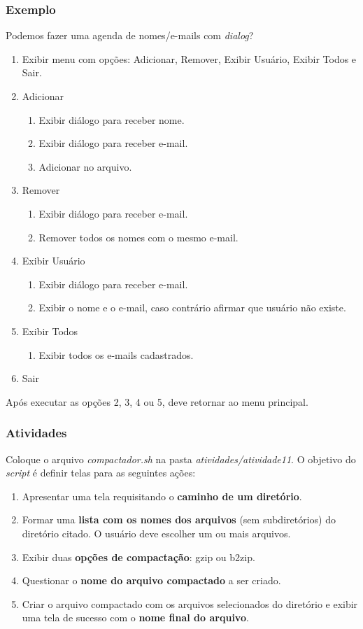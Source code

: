 \documentclass{beamer}
\begin{document}
   \begin{frame}
      \frametitle{Exemplo}
      Podemos fazer uma agenda de nomes/e-mails com \textit{dialog}?
      \scriptsize
      \begin{enumerate}
         \item Exibir menu com opções: Adicionar, Remover, Exibir Usuário, Exibir Todos e Sair.
	 \item Adicionar
	 \begin{enumerate}
            \scriptsize
	    \item Exibir diálogo para receber nome.
	    \item Exibir diálogo para receber e-mail.
	    \item Adicionar no arquivo.
	 \end{enumerate}
	 \item Remover
	 \begin{enumerate}
            \scriptsize
	    \item Exibir diálogo para receber e-mail.
	    \item Remover todos os nomes com o mesmo e-mail.
	 \end{enumerate}
	 \item Exibir Usuário
	 \begin{enumerate}
            \scriptsize
	    \item Exibir diálogo para receber e-mail.
	    \item Exibir o nome e o e-mail, caso contrário afirmar que usuário não existe.
	 \end{enumerate}
	 \item Exibir Todos
	 \begin{enumerate}
            \scriptsize
	    \item Exibir todos os e-mails cadastrados.
	 \end{enumerate}
	 \item Sair
      \end{enumerate}
      \normalsize
      Após executar as opções 2, 3, 4 ou 5, deve retornar ao menu principal.
   \end{frame}

   \begin{frame}
      \frametitle{Atividades}
      Coloque o arquivo \textit{compactador.sh} na pasta \textit{atividades/atividade11}. O objetivo do \textit{script} é definir telas para as seguintes ações:
      \begin{enumerate}
         \item Apresentar uma tela requisitando o \textbf{caminho de um diretório}.
	 \item Formar uma \textbf{lista com os nomes dos arquivos} (sem subdiretórios) do diretório citado. O usuário deve escolher um ou mais arquivos.
	 \item Exibir duas \textbf{opções de compactação}: gzip ou b2zip.
	 \item Questionar o \textbf{nome do arquivo compactado} a ser criado.
	 \item Criar o arquivo compactado com os arquivos selecionados do diretório e exibir uma tela de sucesso com o \textbf{nome final do arquivo}.
      \end{enumerate}
   \end{frame}
\end{document}
